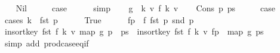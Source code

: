 \begin{isabellebody}
\ \ \isamarkupfalse%
\ Nil\isanewline
\ \ \isamarkupfalse%
\ \isamarkupfalse%
\ {\isacharquery}{\kern0pt}case\isanewline
\ \ \ \ \isamarkupfalse%
\ simp\isanewline
{}\isamarkupfalse%
\isanewline
\ \ \isamarkupfalse%
\ {\isacharquery}{\kern0pt}g\ {\isacharequal}{\kern0pt}\ {\isachardoublequoteopen}{\isacharparenleft}{\kern0pt}{\isasymlambda}{\isacharparenleft}{\kern0pt}k{\isacharcomma}{\kern0pt}\ v{\isacharparenright}{\kern0pt}{\isachardot}{\kern0pt}\ {\isacharparenleft}{\kern0pt}f\ k{\isacharcomma}{\kern0pt}\ v{\isacharparenright}{\kern0pt}{\isacharparenright}{\kern0pt}{\isachardoublequoteclose}\isanewline
\ \ \isamarkupfalse%
\ {\isacharparenleft}{\kern0pt}Cons\ p\ ps{\isacharparenright}{\kern0pt}\isanewline
\ \ \isamarkupfalse%
\ \isamarkupfalse%
\ {\isacharquery}{\kern0pt}case\isanewline
\ \ \isamarkupfalse%
\ {\isacharparenleft}{\kern0pt}cases\ {\isachardoublequoteopen}k\ {\isasymle}\ fst\ p{\isachardoublequoteclose}{\isacharparenright}{\kern0pt}\isanewline
\ \ \ \ \isamarkupfalse%
\ True\isanewline
\ \ \ \ \isamarkupfalse%
\ {\isacharquery}{\kern0pt}f{\isacharunderscore}{\kern0pt}p\ {\isacharequal}{\kern0pt}\ {\isachardoublequoteopen}{\isacharparenleft}{\kern0pt}f\ {\isacharparenleft}{\kern0pt}fst\ p{\isacharparenright}{\kern0pt}{\isacharcomma}{\kern0pt}\ snd\ p{\isacharparenright}{\kern0pt}{\isachardoublequoteclose}\isanewline
\ \ \ \ \isamarkupfalse%
\ {\isachardoublequoteopen}insort{\isacharunderscore}{\kern0pt}key\ fst\ {\isacharparenleft}{\kern0pt}f\ k{\isacharcomma}{\kern0pt}\ v{\isacharparenright}{\kern0pt}\ {\isacharparenleft}{\kern0pt}map\ {\isacharquery}{\kern0pt}g\ {\isacharparenleft}{\kern0pt}p\ {\isacharhash}{\kern0pt}\ ps{\isacharparenright}{\kern0pt}{\isacharparenright}{\kern0pt}\ {\isacharequal}{\kern0pt}\ insort{\isacharunderscore}{\kern0pt}key\ fst\ {\isacharparenleft}{\kern0pt}f\ k{\isacharcomma}{\kern0pt}\ v{\isacharparenright}{\kern0pt}\ {\isacharparenleft}{\kern0pt}{\isacharquery}{\kern0pt}f{\isacharunderscore}{\kern0pt}p\ {\isacharhash}{\kern0pt}\ map\ {\isacharquery}{\kern0pt}g\ ps{\isacharparenright}{\kern0pt}{\isachardoublequoteclose}\isanewline
\ \ \ \ \ \ \isamarkupfalse%
\ {\isacharparenleft}{\kern0pt}simp\ add{\isacharcolon}{\kern0pt}\ prod{\isachardot}{\kern0pt}case{\isacharunderscore}{\kern0pt}eq{\isacharunderscore}{\kern0pt}if{\isacharparenright}{\kern0pt}\isanewline
\ \ \ \ \isamarkupfalse%

\end{isabellebody}
